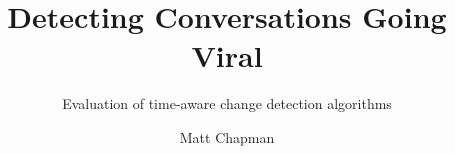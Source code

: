 \documentclass{uvamscse}
\title{Detecting Conversations Going Viral}
\subtitle{Evaluation of time-aware change detection algorithms}
\author{Matt Chapman}
\begin{document}
\nocite{*}
\maketitle



{%


}
\end{document}
